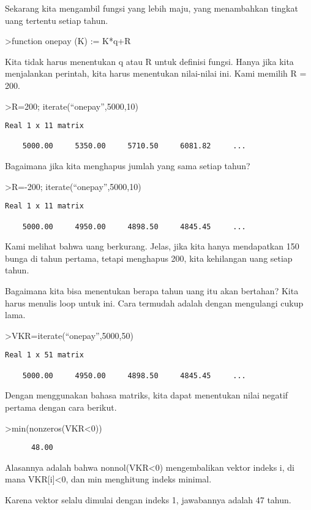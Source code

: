 \documentclass[
]{book}
\begin{document}
Sekarang kita mengambil fungsi yang lebih maju, yang menambahkan tingkat uang tertentu setiap tahun.

\textgreater function onepay (K) := K*q+R

Kita tidak harus menentukan q atau R untuk definisi fungsi. Hanya jika kita menjalankan perintah, kita harus menentukan nilai-nilai ini. Kami memilih R = 200.

\textgreater R=200; iterate(``onepay'',5000,10)

\begin{verbatim}
Real 1 x 11 matrix

    5000.00     5350.00     5710.50     6081.82     ...
\end{verbatim}

Bagaimana jika kita menghapus jumlah yang sama setiap tahun?

\textgreater R=-200; iterate(``onepay'',5000,10)

\begin{verbatim}
Real 1 x 11 matrix

    5000.00     4950.00     4898.50     4845.45     ...
\end{verbatim}

Kami melihat bahwa uang berkurang. Jelas, jika kita hanya mendapatkan 150 bunga di tahun pertama, tetapi menghapus 200, kita kehilangan uang setiap tahun.

Bagaimana kita bisa menentukan berapa tahun uang itu akan bertahan? Kita harus menulis loop untuk ini. Cara termudah adalah dengan mengulangi cukup lama.

\textgreater VKR=iterate(``onepay'',5000,50)

\begin{verbatim}
Real 1 x 51 matrix

    5000.00     4950.00     4898.50     4845.45     ...
\end{verbatim}

Dengan menggunakan bahasa matriks, kita dapat menentukan nilai negatif pertama dengan cara berikut.

\textgreater min(nonzeros(VKR\textless0))

\begin{verbatim}
      48.00 
\end{verbatim}

Alasannya adalah bahwa nonnol(VKR\textless0) mengembalikan vektor indeks i, di mana VKR{[}i{]}\textless0, dan min menghitung indeks minimal.

Karena vektor selalu dimulai dengan indeks 1, jawabannya adalah 47 tahun.
\end{document}
